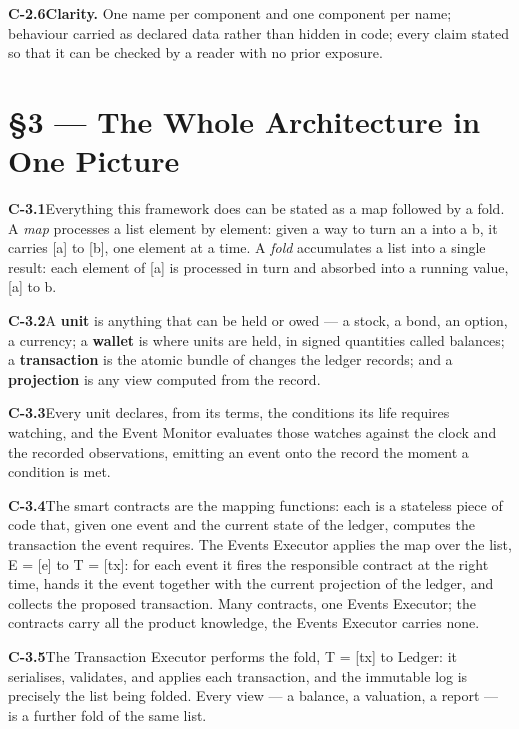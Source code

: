 \documentclass[11pt,a4paper]{article}
\newcommand{\clause}[2]{\par\medskip\noindent\textbf{#1}\hspace{0.6em}#2}
\begin{document}
\clause{C-2.6}{\textbf{Clarity.} One name per component and one component per name;
behaviour carried as declared data rather than hidden in code; every claim stated
so that it can be checked by a reader with no prior exposure.}

\section*{\S3 --- The Whole Architecture in One Picture}

\clause{C-3.1}{Everything this framework does can be stated as a map followed by a
fold. A \emph{map} processes a list element by element: given a way to turn an a
into a b, it carries [a] to [b], one element at a time. A \emph{fold} accumulates
a list into a single result: each element of [a] is processed in turn and absorbed
into a running value, [a] to b.}

\clause{C-3.2}{A \textbf{unit} is anything that can be held or owed --- a stock, a
bond, an option, a currency; a \textbf{wallet} is where units are held, in signed
quantities called balances; a \textbf{transaction} is the atomic bundle of changes
the ledger records; and a \textbf{projection} is any view computed from the
record.}

\clause{C-3.3}{Every unit declares, from its terms, the conditions its life
requires watching, and the Event Monitor evaluates those watches against the clock
and the recorded observations, emitting an event onto the record the moment a
condition is met.}

\clause{C-3.4}{The smart contracts are the mapping functions: each is a stateless
piece of code that, given one event and the current state of the ledger, computes
the transaction the event requires. The Events Executor applies the map over the
list, E = [e] to T = [tx]: for each event it fires the responsible contract at the
right time, hands it the event together with the current projection of the ledger,
and collects the proposed transaction. Many contracts, one Events Executor; the
contracts carry all the product knowledge, the Events Executor carries none.}

\clause{C-3.5}{The Transaction Executor performs the fold, T = [tx] to Ledger: it
serialises, validates, and applies each transaction, and the immutable log is
precisely the list being folded. Every view --- a balance, a valuation, a report
--- is a further fold of the same list.}
\end{document}
